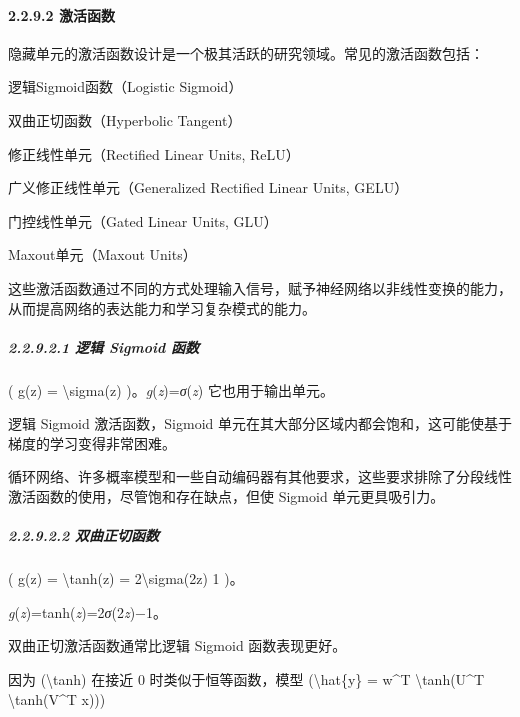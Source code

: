 \paragraph{\texorpdfstring{\textbf{2.2.9.2}
\textbf{激活函数}}{2.2.9.2 激活函数}}\label{2292-ux6fc0ux6d3bux51fdux6570}

隐藏单元的激活函数设计是一个极其活跃的研究领域。常见的激活函数包括：

逻辑Sigmoid函数（Logistic Sigmoid）

双曲正切函数（Hyperbolic Tangent）

修正线性单元（Rectified Linear Units, ReLU）

广义修正线性单元（Generalized Rectified Linear Units, GELU）

门控线性单元（Gated Linear Units, GLU）

Maxout单元（Maxout Units）

这些激活函数通过不同的方式处理输入信号，赋予神经网络以非线性变换的能力，从而提高网络的表达能力和学习复杂模式的能力。

\subparagraph{\texorpdfstring{\textbf{2.2.9.2.1} \textbf{逻辑 Sigmoid
函数}}{2.2.9.2.1 逻辑 Sigmoid 函数}}\label{22921-ux903bux8f91-sigmoid-ux51fdux6570}


( g(z) = \textbackslash sigma(z)
)。\emph{g}(\emph{z})=\emph{σ}(\emph{z}) 它也用于输出单元。

逻辑 Sigmoid 激活函数，Sigmoid
单元在其大部分区域内都会饱和，这可能使基于梯度的学习变得非常困难。

循环网络、许多概率模型和一些自动编码器有其他要求，这些要求排除了分段线性激活函数的使用，尽管饱和存在缺点，但使
Sigmoid 单元更具吸引力。

\subparagraph{\texorpdfstring{\textbf{2.2.9.2.2}
\textbf{双曲正切函数}}{2.2.9.2.2 双曲正切函数}}\label{22922-ux53ccux66f2ux6b63ux5207ux51fdux6570}


( g(z) = \textbackslash tanh(z) = 2\textbackslash sigma(2z) 1 )。

\emph{g}(\emph{z})=tanh(\emph{z})=2\emph{σ}(2\emph{z})−1。

双曲正切激活函数通常比逻辑 Sigmoid 函数表现更好。

因为 (\textbackslash tanh) 在接近 0 时类似于恒等函数，模型
(\textbackslash hat\{y\} = w\^{}T \textbackslash tanh(U\^{}T
\textbackslash tanh(V\^{}T x)))

